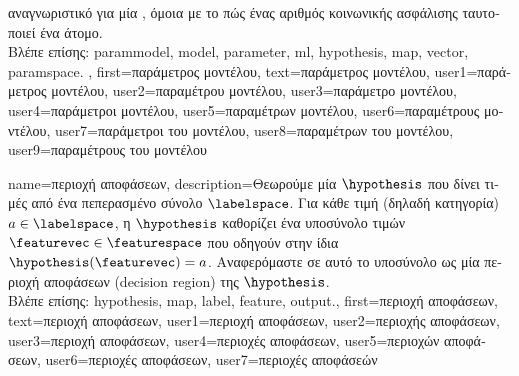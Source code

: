 {{{		αναγνωριστικό για μία}  , \foreignlanguage{greek}{όμοια με το πώς ένας αριθμός 
		κοινωνικής ασφάλισης ταυτοποιεί ένα άτομο.}
		\\
		\foreignlanguage{greek}{Βλέπε επίσης:} \gls{parammodel}, \gls{model}, \gls{parameter}, \gls{ml}, \gls{hypothesis}, \gls{map}, 
		\gls{vector}, \gls{paramspace}.  },
	first={\foreignlanguage{greek}{παράμετρος μοντέλου}},
	text={\foreignlanguage{greek}{παράμετρος μοντέλου}},
	user1={\foreignlanguage{greek}{παράμετρος μοντέλου}}, %
	user2={\foreignlanguage{greek}{παραμέτρου μοντέλου}}, %
	user3={\foreignlanguage{greek}{παράμετρο μοντέλου}}, %
	user4={\foreignlanguage{greek}{παράμετροι μοντέλου}}, %
	user5={\foreignlanguage{greek}{παραμέτρων μοντέλου}}, %
	user6={\foreignlanguage{greek}{παραμέτρους μοντέλου}}, %
	user7={\foreignlanguage{greek}{παράμετροι του μοντέλου}}, %
	user8={\foreignlanguage{greek}{παραμέτρων του μοντέλου}}, %
	user9={\foreignlanguage{greek}{παραμέτρους του μοντέλου}} %
}

{name={\foreignlanguage{greek}{περιοχή αποφάσεων}}, 
	description={\foreignlanguage{greek}{Θεωρούμε μία}  
		 $\hypothesis$ \foreignlanguage{greek}{που δίνει τιμές από ένα πεπερασμένο σύνολο $\labelspace$. 
		Για κάθε τιμή}  \foreignlanguage{greek}{(δηλαδή κατηγορία) $a \in \labelspace$, η}  
		$\hypothesis$ \foreignlanguage{greek}{καθορίζει ένα υποσύνολο τιμών}  $\featurevec \in \featurespace$ 
		\foreignlanguage{greek}{που οδηγούν στην ίδια}  $\hypothesis(\featurevec)=a$. 
		\foreignlanguage{greek}{Αναφερόμαστε σε αυτό το υποσύνολο ως μία περιοχή αποφάσεων} (decision region) 
		\foreignlanguage{greek}{της}  $\hypothesis$.
		\\
		\foreignlanguage{greek}{Βλέπε επίσης:} \gls{hypothesis}, \gls{map}, \gls{label}, \gls{feature}, \gls{output}.},
	first={\foreignlanguage{greek}{περιοχή αποφάσεων}},
	text={\foreignlanguage{greek}{περιοχή αποφάσεων}},
	user1={\foreignlanguage{greek}{περιοχή αποφάσεων}}, %
	user2={\foreignlanguage{greek}{περιοχής αποφάσεων}}, %
	user3={\foreignlanguage{greek}{περιοχή αποφάσεων}}, %
	user4={\foreignlanguage{greek}{περιοχές αποφάσεων}}, %
	user5={\foreignlanguage{greek}{περιοχών αποφάσεων}}, %
	user6={\foreignlanguage{greek}{περιοχές αποφάσεων}}, %
	user7={\foreignlanguage{greek}{περιοχές αποφάσεών}} %
}

